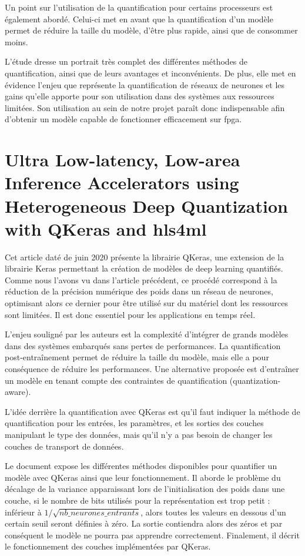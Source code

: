 Un point sur l'utilisation de la quantification pour certains processeurs est également abordé. Celui-ci met en avant que la quantification d'un modèle permet de réduire la taille du modèle, d'être plus rapide, ainsi que de consommer moins.

L'étude dresse un portrait très complet des différentes méthodes de quantification, ainsi que de leurs avantages et inconvénients. De plus, elle met en évidence l'enjeu que représente la quantification de réseaux de neurones et les gains qu'elle apporte pour son utilisation dans des systèmes aux ressources limitées. Son utilisation au sein de notre projet paraît donc indispensable afin d'obtenir un modèle capable de fonctionner efficacement sur \acrshort{fpga}.

\section{Ultra Low-latency, Low-area Inference Accelerators using Heterogeneous Deep Quantization with QKeras and hls4ml \cite{coelho_jr_ultra_2020}}

Cet article daté de juin 2020 présente la librairie QKeras, une extension de la librairie Keras permettant la création de modèles de deep learning quantifiés. Comme nous l'avons vu dans l'article précédent, ce procédé correspond à la réduction de la précision numérique des poids dans un réseau de neurones, optimisant alors ce dernier pour être utilisé sur du matériel dont les ressources sont limitées. Il est donc essentiel pour les applications en temps réel.

L'enjeu souligné par les auteurs est la complexité d'intégrer de grands modèles dans des systèmes embarqués sans pertes de performances. La quantification post-entraînement permet de réduire la taille du modèle, mais elle a pour conséquence de réduire les performances. Une alternative proposée est d'entraîner un modèle en tenant compte des contraintes de quantification (quantization-aware).

L'idée derrière la quantification avec QKeras est qu'il faut indiquer la méthode de quantification pour les entrées, les paramètres, et les sorties des couches manipulant le type des données, mais qu'il n'y a pas besoin de changer les couches de transport de données.

Le document expose les différentes méthodes disponibles pour quantifier un modèle avec QKeras ainsi que leur fonctionnement. Il aborde le problème du décalage de la variance apparaissant lors de l'initialisation des poids dans une couche, si le nombre de bits utilisés pour la représentation est trop petit : inférieur à $1/\sqrt{nb\_neurones\_entrants}$, alors toutes les valeurs en dessous d'un certain seuil seront définies à zéro. La sortie contiendra alors des zéros et par conséquent le modèle ne pourra pas apprendre correctement. Finalement, il décrit le fonctionnement des couches implémentées par QKeras.

